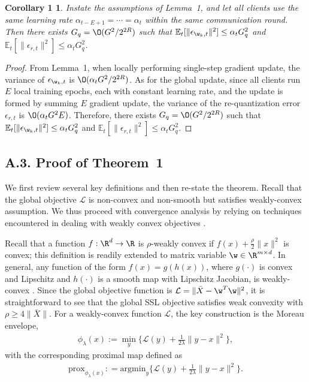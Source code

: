 \documentclass[a4paper,11pt]{article}
\begin{document}
\newtheorem*{corollary1}{Corollary 1}
\begin{corollary1}
Instate the assumptions of Lemma~1, and let all clients use the same learning rate $\alpha_{t-E+1} = \cdots = \alpha_t$ within the same communication round. Then there exists $G_q = \O(G^2/2^{2R})$ such that $\mathbb{E}_t[\|\epsilon_{\w_k, t} \|^2 ]\leq \alpha_t G_q^2 $ and $\mathbb{E}_t[\|\epsilon_{r, t} \|^2 ]\leq \alpha_t G_q^2 $.
\end{corollary1}
\begin{proof}
From Lemma~1, when locally performing single-step gradient update, the variance of $\epsilon_{\w_k, t}$ is $\O(\alpha_t G^2/2^{2R})$. As for the global update, since all clients run $E$ local training epochs, each with constant learning rate, and the update is formed by summing $E$ gradient update, the variance of the re-quantization error $\epsilon_{r, t}$ is $\O(\alpha_t G^2 E) $. Therefore, there exists $G_q =  \O(G^2/2^{2R})$ such that $\mathbb{E}_t[\|\epsilon_{\w_k, t} \|^2 ]\leq \alpha_t G_q^2 $ and $\mathbb{E}_t[\|\epsilon_{r, t} \|^2 ]\leq \alpha_t G_q^2 $.
\end{proof}

    \subsection*{A.3. Proof of Theorem~1}
    We first review several key definitions and then re-state the theorem.
Recall that the global objective $\mathcal{L}$ is non-convex and non-smooth but satisfies weakly-convex assumption. We thus proceed with convergence analysis by relying on techniques encountered in dealing with weakly convex objectives \cite{davis2019stochastic}.

Recall that a function $f: \R^d \to \R $ is $\rho$-weakly convex if $f(x) + \frac{\rho}{2}\|x \|^2$ is convex; this definition is readily extended to matrix variable $\w \in \R^{m \times d}$. In general, any function of the form $f(x) = g(h(x))$, where $g(\cdot)$ is convex and Lipschitz and $h(\cdot)$ is a smooth map with Lipschitz Jacobian, is weakly-convex \cite{davis2019stochastic}.
Since the global objective function is $ \mathcal{L} = \|\bar{X} - \w^T \w \|^2$,
it is straightforward to see that the global SSL objective satisfies weak convexity with $\rho \geq 4\|\bar{X} \|$. For a weakly-convex function $\mathcal{L}$, the key construction is the Moreau envelope,
\begin{align*}
    \phi_{\lambda}(x) := \min_y \{\mathcal{L}(y) + \frac{1}{2\lambda}\|y-x \|^2 \},
\end{align*}
with the corresponding proximal map defined as
\begin{align*}    \mathrm{prox}_{\phi_{\lambda}(x) } : = \mathrm{argmin}_y  \{\mathcal{L}(y) + \frac{1}{2\lambda}\|y-x \|^2 \}.
\end{align*}
\end{document}
